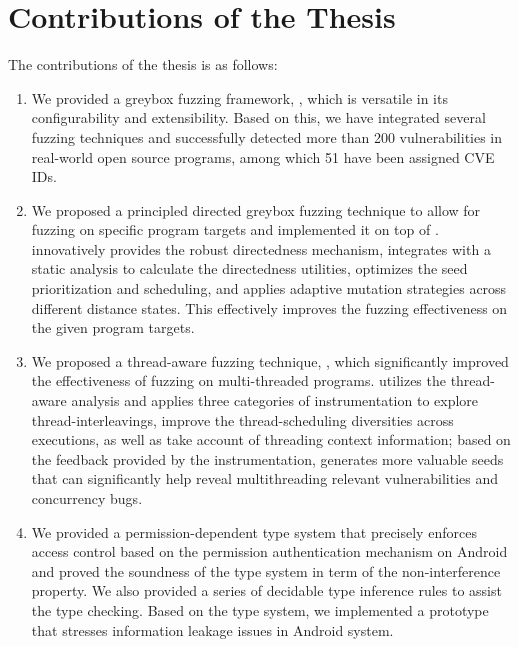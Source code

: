 \section{Contributions of the Thesis}
The contributions of the thesis is as follows:
\begin{enumerate}
	\item We provided a greybox fuzzing framework, \FOT, which is versatile in its configurability and extensibility. Based on this, we have integrated several fuzzing techniques and successfully detected more than 200 vulnerabilities in real-world open source programs, among which 51 have been assigned CVE IDs.
	\item We proposed a principled directed greybox fuzzing technique \dFOT to allow for fuzzing on specific program targets and implemented it on top of \FOT. \dFOT innovatively provides the robust directedness mechanism, integrates with a static analysis to calculate the directedness utilities, optimizes the seed prioritization and scheduling, and applies adaptive mutation strategies across different distance states. This effectively improves the fuzzing effectiveness on the given program targets.
	\item We proposed a thread-aware fuzzing technique, \mtfuzz, which significantly improved the effectiveness of fuzzing on multi-threaded programs. \mtfuzz utilizes the thread-aware analysis and applies three categories of instrumentation to explore thread-interleavings,  improve the thread-scheduling diversities across executions, as well as take account of threading context information; based on the feedback provided by the instrumentation, \mtfuzz generates more valuable seeds that can significantly help reveal multithreading relevant vulnerabilities and concurrency bugs.
	\item We provided a permission-dependent type system that precisely enforces access control based on the permission authentication mechanism on Android and proved the soundness of the type system in term of the non-interference property. We also provided a series of decidable type inference rules to assist the type checking. Based on the type system, we implemented a prototype that stresses information leakage issues in Android system.
\end{enumerate}


